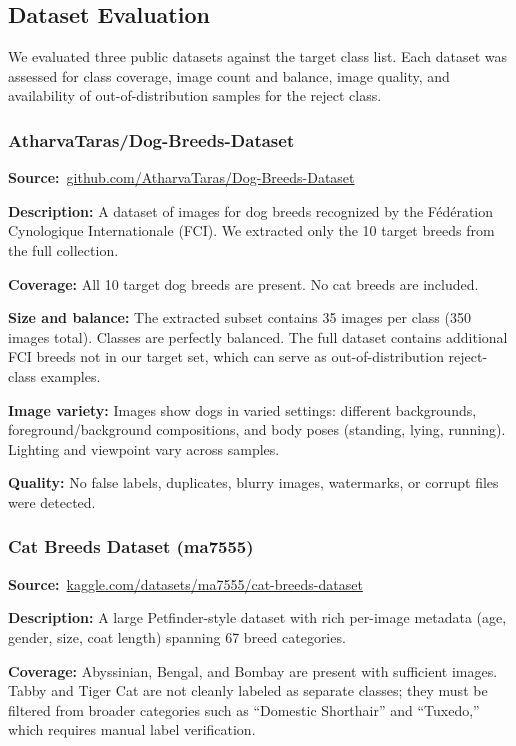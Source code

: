 \documentclass[10pt,twocolumn,letterpaper]{article}
\begin{document}
\subsection{Dataset Evaluation}

We evaluated three public datasets against the target class list. Each dataset was assessed for class coverage, image count and balance, image quality, and availability of out-of-distribution samples for the reject class.

\subsubsection{AtharvaTaras/Dog-Breeds-Dataset}

\textbf{Source:}~\url{github.com/AtharvaTaras/Dog-Breeds-Dataset}

\textbf{Description:} A dataset of images for dog breeds recognized by the Fédération Cynologique Internationale (FCI). We extracted only the 10 target breeds from the full collection.

\textbf{Coverage:} All 10 target dog breeds are present. No cat breeds are included.

\textbf{Size and balance:} The extracted subset contains 35 images per class (350 images total). Classes are perfectly balanced. The full dataset contains additional FCI breeds not in our target set, which can serve as out-of-distribution reject-class examples.

\textbf{Image variety:} Images show dogs in varied settings: different backgrounds, foreground/background compositions, and body poses (standing, lying, running). Lighting and viewpoint vary across samples.

\textbf{Quality:} No false labels, duplicates, blurry images, watermarks, or corrupt files were detected.

\subsubsection{Cat Breeds Dataset (ma7555)}

\textbf{Source:}~\url{kaggle.com/datasets/ma7555/cat-breeds-dataset}

\textbf{Description:} A large Petfinder-style dataset with rich per-image metadata (age, gender, size, coat length) spanning 67 breed categories.

\textbf{Coverage:} Abyssinian, Bengal, and Bombay are present with sufficient images. Tabby and Tiger Cat are not cleanly labeled as separate classes; they must be filtered from broader categories such as ``Domestic Shorthair'' and ``Tuxedo,'' which requires manual label verification.
\end{document}
